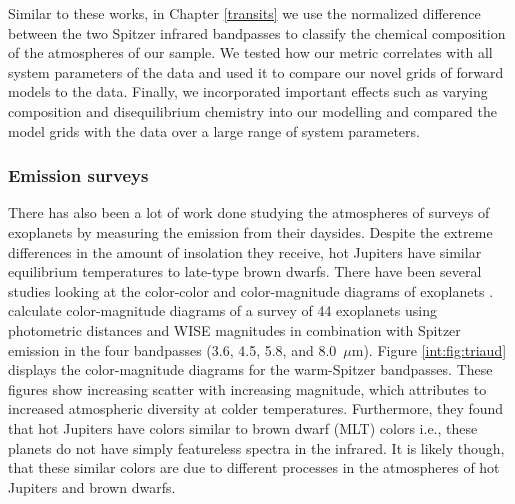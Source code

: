Similar to these works, in Chapter \ref{transits} we use the normalized difference between the two Spitzer infrared bandpasses to classify the chemical composition of the atmospheres of our sample. We tested how our metric correlates with all system parameters of the data and used it to compare our novel grids of forward models to the data. Finally, we incorporated important effects such as varying composition and disequilibrium chemistry into our modelling and compared the model grids with the data over a large range of system parameters.

\subsubsection{Emission surveys}

There has also been a lot of work done studying the atmospheres of surveys of exoplanets by measuring the emission from their daysides. Despite the extreme differences in the amount of insolation they receive, hot Jupiters have similar equilibrium temperatures to late-type brown dwarfs. There have been several studies looking at the color-color and color-magnitude diagrams of exoplanets \citep{Triaud2014a, Triaud2014c, Dransfield2020, Melville2020}. \citet{Triaud2014c} calculate color-magnitude diagrams of a survey of 44 exoplanets using photometric distances and WISE magnitudes in combination with Spitzer emission in the four bandpasses (3.6, 4.5, 5.8, and 8.0~$\mu$m). Figure \ref{int:fig:triaud} displays the color-magnitude diagrams for the warm-Spitzer bandpasses. These figures show increasing scatter with increasing magnitude, which \citet{Triaud2014c} attributes to increased atmospheric diversity at colder temperatures. Furthermore, they found that hot Jupiters have colors similar to brown dwarf (MLT) colors i.e., these planets do not have simply featureless spectra in the infrared. It is likely though, that these similar colors are due to different processes in the atmospheres of hot Jupiters and brown dwarfs.


